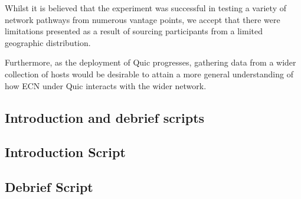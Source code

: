 \documentclass{l4proj}
\begin{document}
Whilst it is believed that the experiment was successful in testing a variety of network pathways from numerous vantage points, we accept that there were limitations presented as a result of sourcing participants from a limited geographic distribution.

Furthermore, as the deployment of Quic progresses, gathering data from a wider collection of hosts would be desirable to attain a more general understanding of how ECN under Quic interacts with the wider network.


%
% 

\begin{appendices}

\chapter{Introduction and debrief scripts}

\section{Introduction Script}
\section{Debrief Script}

\end{appendices}






\end{document}
